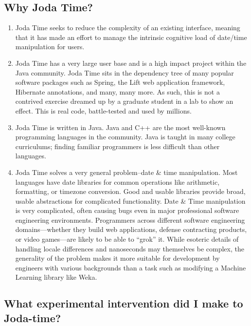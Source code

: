 \subsection{Why Joda Time?}
\begin{enumerate}
	\item Joda Time seeks to reduce the complexity of an existing interface, meaning that it has made an effort to manage the intrinsic cognitive load of date/time manipulation for users.

	\item Joda Time has a very large user base and is a high impact project within the Java community. Joda Time sits in the dependency tree of many popular software packages such as Spring, the Lift web application framework, Hibernate annotations, and many, many more. As such, this is not a contrived exercise dreamed up by a graduate student in a lab to show an effect. This is real code, battle-tested and used by millions.

	\item Joda Time is written in Java. Java and C++ are the most well-known programming languages in the community. Java is taught in many college curriculums; finding familiar programmers is less difficult than other languages. 

	\item Joda Time solves a very general problem--date \& time manipulation. Most languages have date libraries for common operations like arithmetic, formatting, or timezone conversion. Good and usable libraries provide broad, usable abstractions for complicated functionality. Date \& Time manipulation is very complicated, often causing bugs even in major professional software engineering environments. Programmers across different software engineering domains—whether they build web applications, defense contracting products, or video games—are likely to be able to “grok” it. While esoteric details of handling locale differences and nanoseconds may themselves be complex, the generality of the problem makes it more suitable for development by engineers with various backgrounds than a task such as modifying a Machine Learning library like Weka.  
\end{enumerate}
   
\subsection{What experimental intervention did I make to Joda-time?}

